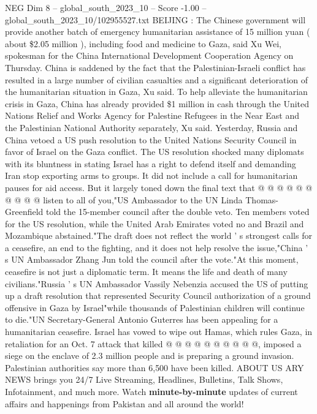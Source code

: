 \begin{textsample}{NEG Dim 8 – global\_south\_2023\_10 – Score -1.00 – global\_south\_2023\_10/102955527.txt}  \label{ex:f8_neg_094}
BEIJING : The Chinese government will provide another batch of emergency humanitarian assistance of 15 million yuan ( about \$2.05 million ), including food and medicine to Gaza, said Xu Wei, spokesman for the China International Development Cooperation Agency on Thursday.
China is saddened by the fact that the Palestinian-Israeli conflict has resulted in a large number of civilian casualties and a significant deterioration of the humanitarian situation in Gaza, Xu said.
To help alleviate the humanitarian crisis in Gaza, China has already provided \$1 million in cash through the United Nations Relief and Works Agency for Palestine Refugees in the Near East and the Palestinian National Authority separately, Xu said.
Yesterday, Russia and China vetoed a US push resolution to the United Nations Security Council in favor of Israel on the Gaza conflict.
The US resolution shocked many diplomats with its bluntness in stating Israel has a right to defend itself and demanding Iran stop exporting arms to groups.
It did not include a call for humanitarian pauses for aid access.
But it largely toned down the final text that @ @ @ @ @ @ @ @ @ @ listen to all of you,"US Ambassador to the UN Linda Thomas-Greenfield told the 15-member council after the double veto.
Ten members voted for the US resolution, while the United Arab Emirates voted no and Brazil and Mozambique abstained."The draft does not reflect the world ' s strongest calls for a ceasefire, an end to the fighting, and it does not help resolve the issue,"China ' s UN Ambassador Zhang Jun told the council after the vote."At this moment, ceasefire is not just a diplomatic term.
It means the life and death of many civilians."Russia ' s UN Ambassador Vassily Nebenzia accused the US of putting up a draft resolution that represented Security Council authorization of a ground offensive in Gaza by Israel"while thousands of Palestinian children will continue to die."UN Secretary-General Antonio Guterres has been appealing for a humanitarian ceasefire.
Israel has vowed to wipe out Hamas, which rules Gaza, in retaliation for an Oct. 7 attack that killed @ @ @ @ @ @ @ @ @ @, imposed a siege on the enclave of 2.3 million people and is preparing a ground invasion.
Palestinian authorities say more than 6,500 have been killed.
ABOUT US ARY NEWS brings you 24/7 Live Streaming, Headlines, Bulletins, Talk Shows, Infotainment, and much more.
Watch \textbf{minute-by-minute} updates of current affairs and happenings from Pakistan and all around the world!

\end{textsample}
